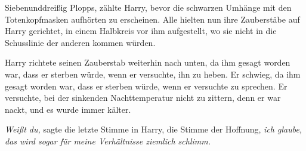 Siebenunddreißig Plopps, zählte Harry, bevor die schwarzen Umhänge mit den Totenkopfmasken aufhörten zu erscheinen.
Alle hielten nun ihre Zauberstäbe auf Harry gerichtet, in einem Halbkreis vor ihm aufgestellt, wo sie nicht in die Schusslinie der anderen kommen würden.

Harry richtete seinen Zauberstab weiterhin nach unten, da ihm gesagt worden war, dass er sterben würde, wenn er versuchte, ihn zu heben. Er schwieg, da ihm gesagt worden war, dass er sterben würde, wenn er versuchte zu sprechen. Er versuchte, bei der sinkenden Nachttemperatur nicht zu zittern, denn er war nackt, und es wurde immer kälter.

\emph{Weißt du,} sagte die letzte Stimme in Harry, die Stimme der Hoffnung, \emph{ich glaube, das wird sogar für meine Verhältnisse ziemlich schlimm.}

